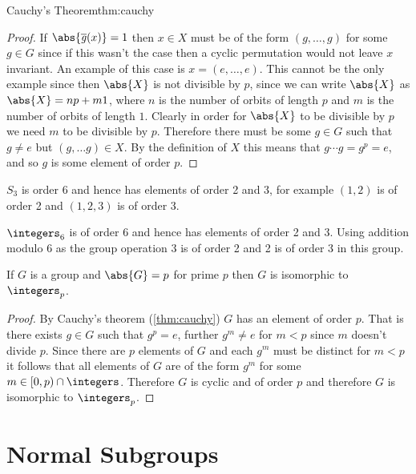 \documentclass[fleqn]{NotesClass}
\newcommand*{\intersection}{\cap}
\newcommand{\orbit}{\mathit{g}}
\begin{document}
\begin{thm}{Cauchy's Theorem}{thm:cauchy}
\begin{proof}
            If \(\abs{\overline{\orbit}(x)} = 1\) then \(x\in X\) must be of the form \((g, \dotsc, g)\) for some \(g \in G\) since if this wasn't the case then a cyclic permutation would not leave \(x\) invariant.
            An example of this case is \(x = (e, \dotsc, e)\).
            This cannot be the only example since then \(\abs{X}\) is not divisible by \(p\), since we can write \(\abs{X}\) as \(\abs{X} = np + m1\), where \(n\) is the number of orbits of length \(p\) and \(m\) is the number of orbits of length \(1\).
            Clearly in order for \(\abs{X}\) to be divisible by \(p\) we need \(m\) to be divisible by \(p\).
            Therefore there must be some \(g \in G\) such that \(g \ne e\) but \((g, \dotsc g) \in X\).
            By the definition of \(X\) this means that \(g \dotsm g = g^p = e\), and so \(g\) is some element of order \(p\).
        \end{proof}
    \end{thm}
    
    \begin{exm}{}{}
        \(S_3\) is order 6 and hence has elements of order 2 and 3, for example \((1, 2)\) is of order 2 and \((1, 2, 3)\) is of order 3.
        
        \(\integers_6\) is of order 6 and hence has elements of order 2 and 3.
        Using addition modulo \(6\) as the group operation 3 is of order 2 and 2 is of order 3 in this group.
    \end{exm}
    
    \begin{crl}{}{}
        If \(G\) is a group and \(\abs{G} = p\) for prime \(p\) then \(G\) is isomorphic to \(\integers_p\).
        
        \begin{proof}
            By Cauchy's theorem (\cref{thm:cauchy}) \(G\) has an element of order \(p\).
            That is there exists \(g \in G\) such that \(g^p = e\), further \(g^m \ne e\) for \(m < p\) since \(m\) doesn't divide \(p\).
            Since there are \(p\) elements of \(G\) and each \(g^m\) must be distinct for \(m < p\) it follows that all elements of \(G\) are of the form \(g^m\) for some \(m \in [0, p) \intersection \integers\).
            Therefore \(G\) is cyclic and of order \(p\) and therefore \(G\) is isomorphic to \(\integers_p\).
        \end{proof}
    \end{crl}

    \chapter{Normal Subgroups}
\end{document}
